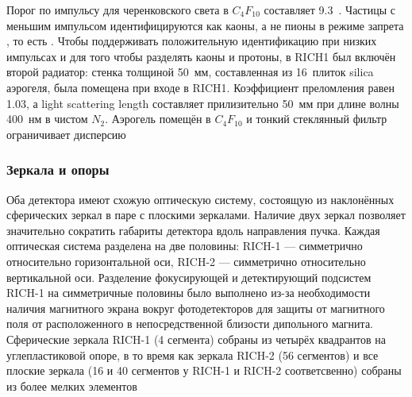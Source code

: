 
Порог по импульсу для черенковского света в $C_{4}F_{10}$ составляет 9.3~\GeVoverC. Частицы с меньшим импульсом идентифицируются как каоны, а не пионы в режиме запрета \todo, то есть \todo.
Чтобы поддерживать положительную идентификацию при низких импульсах и для того чтобы разделять каоны и протоны, в RICH1 был включён второй радиатор: стенка толщиной 50~мм, составленная из 16~плиток silica аэрогеля, была помещена при входе в RICH1. Коэффициент преломления равен 1.03, а light scattering length \todo составляет прилизительно 50~мм при длине волны 400~нм в чистом $N_2$. Аэрогель помещён в $C_{4}F_{10}$ \todo и тонкий стеклянный фильтр ограничивает дисперсию \todo


\subsubsection{Зеркала и опоры}

Оба детектора имеют схожую оптическую систему, состоящую из наклонённых сферических зеркал в паре с плоскими зеркалами. Наличие двух зеркал позволяет значительно сократить габариты детектора вдоль направления пучка. Каждая оптическая система разделена на две половины: \mbox{RICH-1} --- симметрично относительно горизонтальной оси, \mbox{RICH-2} --- симметрично относительно вертикальной оси. Разделение фокусирующей и детектирующий подсистем \mbox{RICH-1} на симметричные половины было выполнено из-за необходимости наличия магнитного экрана вокруг фотодетекторов для защиты от магнитного поля от расположенного в непосредственной близости дипольного магнита.
Сферические зеркала \mbox{RICH-1} (4 сегмента) собраны из четырёх квадрантов на углепластиковой опоре, в то время как зеркала \mbox{RICH-2} (56 сегментов) и все плоские зеркала (16 и 40 сегментов у \mbox{RICH-1} и \mbox{RICH-2} соответсвенно) собраны из более мелких элементов \todo

